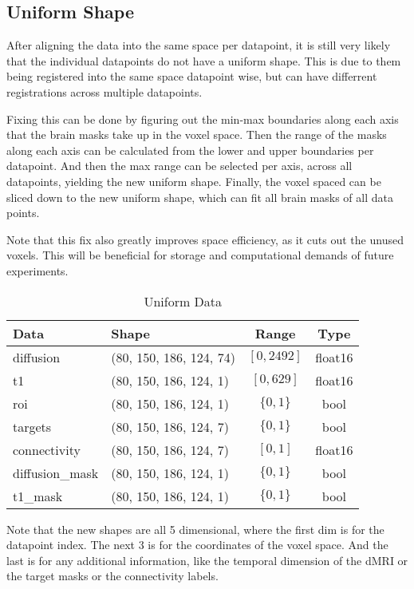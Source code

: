 \subsection{Uniform Shape}
After aligning the data into the same space per datapoint, it is still very likely that the individual datapoints do not have a uniform shape. This is due to them being registered into the same space datapoint wise, but can have differrent registrations across multiple datapoints.\par
Fixing this can be done by figuring out the min-max boundaries along each axis that the brain masks take up in the voxel space. Then the range of the masks along each axis can be calculated from the lower and upper boundaries per datapoint. And then the max range can be selected per axis, across all datapoints, yielding the new uniform shape. Finally, the voxel spaced can be sliced down to the new uniform shape, which can fit all brain masks of all data points.\par
Note that this fix also greatly improves space efficiency, as it cuts out the unused voxels. This will be beneficial for storage and computational demands of future experiments.
\begin{table}[H]
\centering
\begin{tabular}{|l|l|c|c|}
\hline
\textbf{Data} & \textbf{Shape} & \textbf{Range} & \textbf{Type} \\ \hline
diffusion & (80, 150, 186, 124, 74) & $[0,2492]$ & float16 \\ \hline
t1 & (80, 150, 186, 124, 1) & $[0,629]$ & float16 \\ \hline
roi & (80, 150, 186, 124, 1) & $\{0,1\}$ & bool \\ \hline
targets & (80, 150, 186, 124, 7) & $\{0,1\}$ & bool \\ \hline
connectivity & (80, 150, 186, 124, 7) & $[0,1]$ & float16 \\ \hline
diffusion\_mask & (80, 150, 186, 124, 1) & $\{0,1\}$ & bool \\ \hline
t1\_mask & (80, 150, 186, 124, 1) & $\{0,1\}$ & bool \\ \hline
\end{tabular}
\caption{Uniform Data}
\label{tab:datas2}
\end{table}
Note that the new shapes are all 5 dimensional, where the first dim is for the datapoint index. The next 3 is for the coordinates of the voxel space. And the last is for any additional information, like the temporal dimension of the \ac{dMRI} or the target masks or the connectivity labels.

